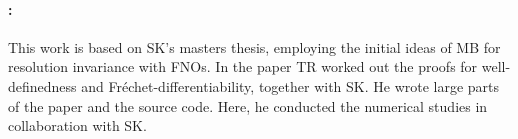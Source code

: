 \paragraph{\cite{kabri2023resolution}:} This work is based on SK's masters thesis, employing the initial ideas of MB for resolution invariance with FNOs. In the paper TR worked out the proofs for well-definedness and Fréchet-differentiability, together with SK. He wrote large parts of the paper and the source code. Here, he conducted the numerical studies in collaboration with SK.

